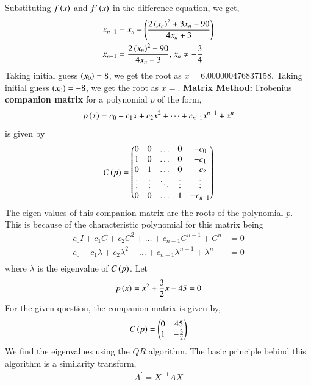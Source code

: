 \documentclass[journal]{IEEEtran}
\begin{document}
\newline
Substituting $f\left(x\right)$ and $f^{\prime}\left(x\right)$ in the difference equation, we get,
\begin{align}
  x_{n + 1} &= x_n - \left(\frac{2\left(x_n\right)^2 + 3x_n - 90}{4x_n + 3}\right)\\
  x_{n + 1} &= \frac{2\left(x_n\right)^2 + 90}{4x_n + 3} \text{, } x_n \neq -\frac{3}{4}
\end{align}
Taking initial guess $\left(x_0\right) = 8$, we get the root as $x = 6.000000476837158$.
Taking initial guess $\left(x_0\right) = -8$, we get the root as $x = $.
\newline
\textbf{Matrix Method:}
Frobenius \textbf{companion matrix} for a polynomial $p$ of the form,
\begin{align}
  p\left(x\right) = c_0 + c_1x + c_2x^2 + \dots + c_{n - 1}x^{n - 1} + x^n
\end{align}
is given by
\begin{align}
  C\left(p\right) = \begin{pmatrix}0 & 0 & \dots & 0 & -c_0\\1 & 0 & \dots & 0 & -c_1\\0 & 1 & \dots & 0 & -c_2\\\vdots & \vdots & \ddots & \vdots & \vdots\\0 & 0 & \dots & 1 & -c_{n - 1}\end{pmatrix}
\end{align}
The eigen values of this companion matrix are the roots of the polynomial $p$. This is because of the characteristic polynomial for this matrix being
\begin{align}
  c_0I + c_1C + c_2C^2 + \dots + c_{n - 1}C^{n - 1} + C^n &= 0\\
  c_0 + c_1\lambda + c_2\lambda^2 + \dots + c_{n - 1}\lambda^{n - 1} + \lambda^n &= 0\\
\end{align}
where $\lambda$ is the eigenvalue of $C\left(p\right)$.
\newline
Let
\begin{align}
  p\left(x\right) = x^2 + \frac{3}{2}x - 45 = 0
\end{align}
For the given question, the companion matrix is given by,
\begin{align}
  C\left(p\right) = \begin{pmatrix}0 & 45\\1 & -\frac{3}{2}\end{pmatrix}
\end{align}
\newline
We find the eigenvalues using the $QR$ algorithm. The basic principle behind this algorithm is a similarity transform,
\begin{align}
  A^{\prime} = X^{-1}AX
\end{align}
\end{document}
